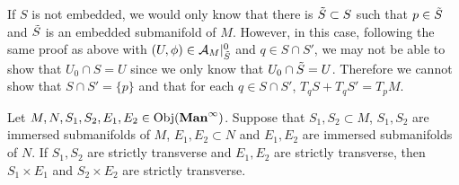 \documentclass{book}
\begin{document}
	\begin{note}
		If $S$ is not embedded, we would only know that there is $\tilde{S} \subset S$ such that $p \in \tilde{S}$ and $\tilde{S}$ is an embedded submanifold of $M$. However, in this case, following the same proof as above with $(U, \phi) \in \mathcal{A}_M|^0_{\tilde{S}}$ and $q \in S \cap S'$, we may not be able to show that $U_0 \cap S = U$ since we only know that $U_0 \cap \tilde{S} = U$. Therefore we cannot show that $S \cap S' = \{p\}$ and that for each $q \in S \cap S'$, $T_q S + T_q S' = T_p M$. 
	\end{note}

	\begin{ex} 
		Let $M, N, S_1, S_2, E_1, E_2 \in \operatorname{Obj}(\operatorname*{\text{\textbf{Man}}^{\infty}})$. Suppose that $S_1, S_2 \subset M$, $S_1, S_2$ are immersed submanifolds of $M$, $E_1, E_2 \subset N$ and $E_1, E_2$ are immersed submanifolds of $N$. If $S_1, S_2$ are strictly transverse and $E_1, E_2$ are strictly transverse, then $S_1 \times E_1$ and $S_2 \times E_2$ are strictly transverse. 
	\end{ex}
\end{document}
